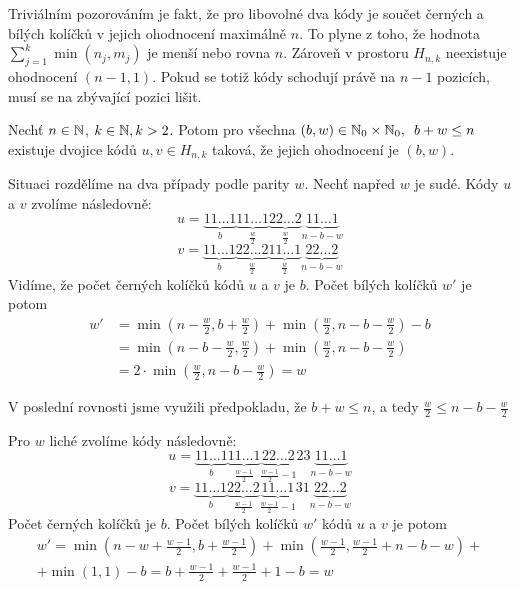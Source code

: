 Triviálním pozorováním je fakt, že pro libovolné dva kódy je součet černých a bílých kolíčků v jejich ohodnocení maximálně $n$. To plyne z toho, že hodnota $\sum_{j = 1}^k  \min(n_j, m_j)$ je menší nebo rovna $n$. Zároveň v prostoru $H_{n,k}$ neexistuje ohodnocení $(n-1,1)$. Pokud se totiž kódy schodují právě na $n-1$ pozicích, musí se na zbývající pozici lišit. 
\begin{tvrz}\label{tvrzohodnoceni}
    Nechť $n \in \mathbb{N}$, $k \in \mathbb{N}, k>2$. Potom pro všechna $(b,w)\in \mathbb{N}_0 \times \mathbb{N}_0,\hspace{5px} b + w \leq n$ existuje dvojice kódů $u,v \in H_{n,k}$ taková, že jejich ohodnocení je $(b,w)$.
\end{tvrz}
\begin{dukaz}

    
    
    Situaci rozdělíme na dva případy podle parity $w$. Nechť napřed $w$ je sudé. Kódy $u$ a $v$ zvolíme následovně:
\[
  u = 
    \underbrace{11\dots1}_{b}
    \underbrace{11\dots1}_{\frac{w}{2}}
    \underbrace{22\dots2}_{\frac{w}{2}}
    \underbrace{11\dots1}_{n-b-w}
 \]
 \[
  v = 
    \underbrace{11\dots1}_{b}
    \underbrace{22\dots2}_{\frac{w}{2}}
    \underbrace{11\dots1}_{\frac{w}{2}}
    \underbrace{22\dots2}_{n-b-w}
 \]
Vidíme, že počet černých kolíčků kódů $u$ a $v$ je $b$. Počet bílých kolíčků $w'$ je potom
\begin{align*} 
w' &= \min\left(n - \frac{w}{2}, b + \frac{w}{2}\right) + \min\left(\frac{w}{2}, n - b - \frac{w}{2}\right) - b \\ 
&= \min\left(n - b - \frac{w}{2}, \frac{w}{2}\right) + \min\left(\frac{w}{2}, n - b - \frac{w}{2}\right) \\
&= 2\cdot\min\left(\frac{w}{2}, n - b - \frac{w}{2}\right) = w
\end{align*}

V poslední rovnosti jsme využili předpokladu, že $b+w \leq n$, a tedy $\frac{w}{2} \leq n - b - \frac{w}{2}$

Pro $w$ liché zvolíme kódy následovně:
\[
  u = 
    \underbrace{11\dots1}_{b}
    \underbrace{11\dots1}_{\frac{w-1}{2}}
    \underbrace{22\dots2}_{\frac{w-1}{2}-1}
    2
    3
    \underbrace{11\dots1}_{n-b-w}
 \]
 \[
  v = 
    \underbrace{11\dots1}_{b}
    \underbrace{22\dots2}_{\frac{w-1}{2}}
    \underbrace{11\dots1}_{\frac{w-1}{2}-1}
    3
    1
    \underbrace{22\dots2}_{n-b-w}
 \]
Počet černých kolíčků je $b$. Počet bílých kolíčků $w'$ kódů $u$ a $v$ je potom
\begin{align*} 
w' = \min\left(n-w+\frac{w-1}{2}, b + \frac{w-1}{2}\right) + \min\left(\frac{w-1}{2}, \frac{w-1}{2} + n-b-w\right) + \\ +\min(1,1) - b 
 = b + \frac{w-1}{2} + \frac{w-1}{2} + 1 - b = w
\end{align*}
\end{dukaz}

